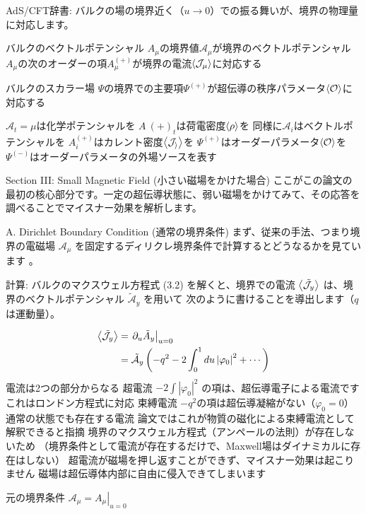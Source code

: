 \documentclass[b5paper,11pt,dvipdfmx]{jsarticle}
\numberwithin{equation}{section}
\theoremstyle{definition}
\begin{document}
AdS/CFT辞書: バルクの場の境界近く（$u \to 0$）での振る舞いが、境界の物理量に対応します。

バルクのベクトルポテンシャル
$A_\mu$の境界値$\mathcal{A}_\mu$が境界のベクトルポテンシャル
$A_\mu$の次のオーダーの項$A_\mu^{(+)}$が境界の電流$\ev{\mathcal{J}_\mu}$に対応する



バルクのスカラー場
$\Psi$の境界での主要項$\Psi^{(+)}$が超伝導の秩序パラメータ$\ev{\mathcal{O}}$に対応する


$\mathcal{A}_t = \mu$は化学ポテンシャルを
$A~{(+)}_t$は荷電密度$\ev{\rho}$を
同様に$\mathcal{A}_i$はベクトルポテンシャルを
$A^{(+)}_i$はカレント密度$\ev{\mathcal{J_i}}$を
$\Psi^{(+)}$はオーダーパラメータ$\ev{\mathcal{O}}$を
$\Psi^{(-)}$はオーダーパラメータの外場ソースを表す



Section III: Small Magnetic Field (小さい磁場をかけた場合)
ここがこの論文の最初の核心部分です。一定の超伝導状態に、弱い磁場をかけてみて、その応答を調べることでマイスナー効果を解析します。

A. Dirichlet Boundary Condition (通常の境界条件)
まず、従来の手法、つまり境界の電磁場
$\mathcal{A}_\mu$ を固定するディリクレ境界条件で計算するとどうなるかを見ています 。


計算: バルクのマクスウェル方程式 (3.2)  を解くと、境界での電流
$\ev{\tilde{\mathcal{J}}_y}$ は、境界のベクトルポテンシャル $\tilde{\mathcal{A}}_y$ を用いて
次のように書けることを導出します（$q$ は運動量）。

\begin{equation}
    \begin{split}
        \ev{\tilde{\mathcal{J}}_y}& =\left.\partial_u \tilde{A}_y\right|_{u=0} \\
        & =\tilde{\mathcal{A}}_y\left(-q^2-2 \int_0^1 d u\left|\varphi_0\right|^2+\cdots\right)
    \end{split}
\end{equation}
電流は2つの部分からなる
超電流
$-2\int |\varphi_0|^2$ の項は、超伝導電子による電流ですこれはロンドン方程式に対応
束縛電流
$-q^2$の項は超伝導凝縮がない（$\varphi_0=0$）通常の状態でも存在する電流
論文ではこれが物質の磁化による束縛電流として解釈できると指摘
境界のマクスウェル方程式（アンペールの法則）が存在しないため
（境界条件として電流が存在するだけで、Maxwell場はダイナミカルに存在はしない）
超電流が磁場を押し返すことができず、マイスナー効果は起こりません
磁場は超伝導体内部に自由に侵入できてしまいます

元の境界条件
$\mathcal{A}_\mu = \left. A_\mu \right|_{u = 0}$
\end{document}
